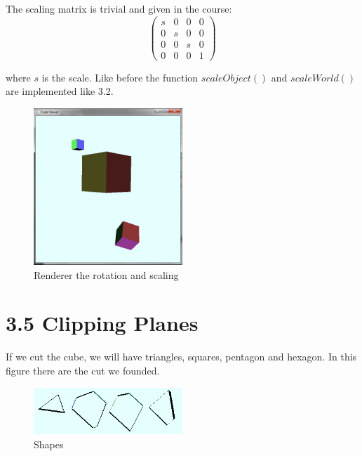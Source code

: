 \documentclass[10pt,a4paper]{report}
\begin{document}
The scaling matrix is trivial and given in the course:
\[ \left( \begin{array}{cccc}
s & 0 & 0 & 0\\
0 & s & 0 & 0\\
0 & 0 & s & 0\\
0 & 0 & 0 & 1\end{array} \right)\] 

where $s$ is the scale.
Like before the function $scaleObject()$ and $scaleWorld()$ are implemented like 3.2.
\begin{figure}[h!]
\caption{Renderer the rotation and scaling}
  \centering
    \includegraphics[width=0.5\textwidth]{3-4.png}
\end{figure}
\newpage
\section*{3.5 Clipping Planes}
If we cut the cube, we will have triangles, squares, pentagon and hexagon.
In this figure there are the cut we founded.
\begin{figure}[h!]
\caption{Shapes}
  \centering
    \includegraphics[width=0.5\textwidth]{formes.png}
\end{figure}
\end{document}
